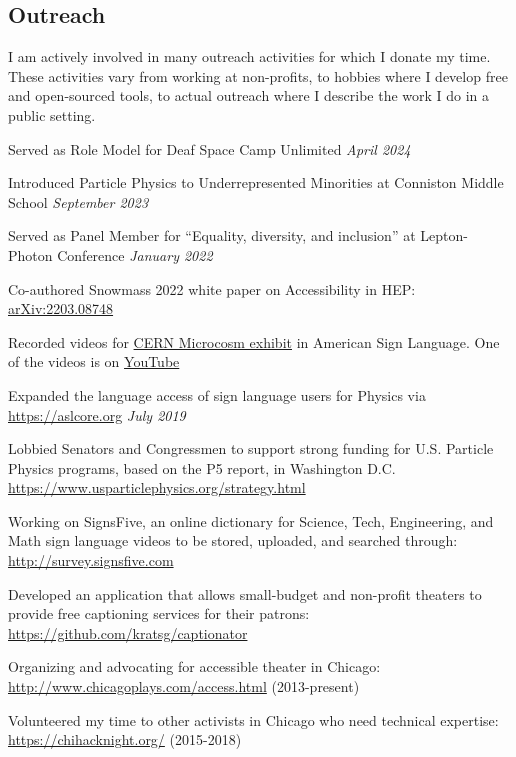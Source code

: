 \documentclass[margin,line]{resume}
\let\origsection\section%
\let\section\subsection%
\let\section\origsection%
\begin{document}
\begin{resume}
\section{\mysidestyle Outreach}
I am actively involved in many outreach activities for which I donate my time. These activities vary from working at non-profits, to hobbies where I develop free and open-sourced tools, to actual outreach where I describe the work I do in a public setting.
\begin{list2}
  \item Served as Role Model for Deaf Space Camp Unlimited \hfill \textsl{April 2024}
  \item Introduced Particle Physics to Underrepresented Minorities at Conniston Middle School \hfill \textsl{September 2023}
  \item Served as Panel Member for ``Equality, diversity, and inclusion'' at Lepton-Photon Conference \hfill \textsl{January 2022}
  \item Co-authored Snowmass 2022 white paper on Accessibility in HEP: \href{https://arxiv.org/abs/2203.08748}{arXiv:2203.08748}
  \item Recorded videos for \href{https://microcosm.web.cern.ch/en}{CERN Microcosm exhibit} in American Sign Language. One of the videos is on \href{https://www.youtube.com/watch?v=BaGjAruqFec}{YouTube}
  \item Expanded the language access of sign language users for Physics via \url{https://aslcore.org} \hfill \textsl{July 2019}
  \item Lobbied Senators and Congressmen to support strong funding for U.S. Particle Physics programs, based on the P5 report, in Washington D.C. \url{https://www.usparticlephysics.org/strategy.html}
  \item Working on SignsFive, an online dictionary for Science, Tech, Engineering, and Math sign language videos to be stored, uploaded, and searched through: \url{http://survey.signsfive.com}
  \item Developed an application that allows small-budget and non-profit theaters to provide free captioning services for their patrons: \url{https://github.com/kratsg/captionator}
  \item Organizing and advocating for accessible theater in Chicago: \url{http://www.chicagoplays.com/access.html} (2013-present)
  \item Volunteered my time to other activists in Chicago who need technical expertise: \url{https://chihacknight.org/} (2015-2018)
\end{list2}


\end{resume}
\end{document}
